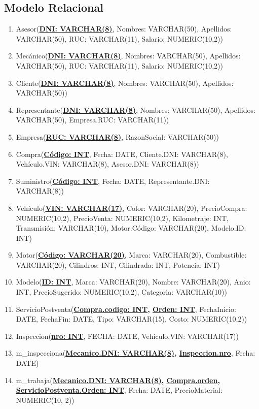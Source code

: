 \documentclass[12pt]{article}
\begin{document}
\subsection{Modelo Relacional}
\begin{enumerate}
\item Asesor(\textbf{\underline{DNI: VARCHAR(8)}}, Nombres: VARCHAR(50), Apellidos: VARCHAR(50), RUC: VARCHAR(11), Salario: NUMERIC(10,2))
\item Mecánico(\textbf{\underline{DNI: VARCHAR(8)}}, Nombres: VARCHAR(50), Apellidos: VARCHAR(50), RUC: VARCHAR(11), Salario: NUMERIC(10,2))
\item Cliente(\textbf{\underline{DNI: VARCHAR(8)}}, Nombres: VARCHAR(50), Apellidos: VARCHAR(50))
\item Representante(\textbf{\underline{DNI: VARCHAR(8)}}, Nombres: VARCHAR(50), Apellidos: VARCHAR(50), Empresa.RUC: VARCHAR(11))
\item Empresa(\textbf{\underline{RUC: VARCHAR(8)}}, RazonSocial: VARCHAR(50))
    
\item Compra(\textbf{\underline{Código: INT}}, Fecha: DATE, Cliente.DNI: VARCHAR(8), Vehículo.VIN: VARCHAR(8), Asesor.DNI: VARCHAR(8))
\item Suministro(\textbf{\underline{Código: INT}}, Fecha: DATE, Representante.DNI: VARCHAR(8))
\item Vehículo(\textbf{\underline{VIN: VARCHAR(17)}}, Color: VARCHAR(20), PrecioCompra: NUMERIC(10,2), PrecioVenta: NUMERIC(10,2), Kilometraje: INT, Transmisión: VARCHAR(10), Motor.Código: VARCHAR(20), Modelo.ID: INT)
\item Motor(\textbf{\underline{Código: VARCHAR(20)}}, Marca: VARCHAR(20), Combustible: VARCHAR(20), Cilindros: INT, Cilindrada: INT, Potencia: INT)
\item Modelo(\textbf{\underline{ID: INT}}, Marca: VARCHAR(20), Nombre: VARCHAR(20), Anio: INT, PrecioSugerido: NUMERIC(10,2), Categoria: VARCHAR(10))

\item ServicioPostventa(\textbf{\underline{Compra.codigo: INT}, \underline{Orden: INT}}, FechaInicio: DATE, FechaFin: DATE, Tipo: VARCHAR(15), Costo: NUMERIC(10,2))
\item Inspeccion(\textbf{\underline{nro: INT}}, FECHA: DATE, Vehículo.VIN: VARCHAR(17))
\item m\_inspecciona(\textbf{\underline{Mecanico.DNI: VARCHAR(8)}, \underline{Inspeccion.nro}}, Fecha: DATE)
\item m\_trabaja(\textbf{\underline{Mecanico.DNI: VARCHAR(8)}, \underline{Compra.orden}, \underline{ServicioPostventa.Orden: INT}}, Fecha: DATE, PrecioMaterial: NUMERIC(10, 2))
\end{enumerate}
\end{document}

